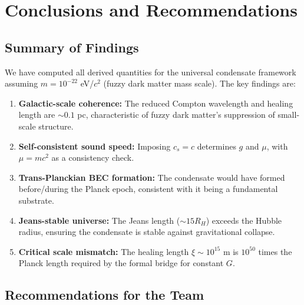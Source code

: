 \documentclass[11pt,a4paper]{article}
\begin{document}
\section{Conclusions and Recommendations}
\label{sec:conclusions}

\subsection{Summary of Findings}

We have computed all derived quantities for the universal condensate framework assuming $m = 10^{-22}$ eV/$c^2$ (fuzzy dark matter mass scale). The key findings are:

\begin{enumerate}
    \item \textbf{Galactic-scale coherence:} The reduced Compton wavelength and healing length are $\sim 0.1$ pc, characteristic of fuzzy dark matter's suppression of small-scale structure.

    \item \textbf{Self-consistent sound speed:} Imposing $c_s = c$ determines $g$ and $\mu$, with $\mu = mc^2$ as a consistency check.

    \item \textbf{Trans-Planckian BEC formation:} The condensate would have formed before/during the Planck epoch, consistent with it being a fundamental substrate.

    \item \textbf{Jeans-stable universe:} The Jeans length ($\sim 15 R_H$) exceeds the Hubble radius, ensuring the condensate is stable against gravitational collapse.

    \item \textbf{Critical scale mismatch:} The healing length $\xi \sim 10^{15}$ m is $10^{50}$ times the Planck length required by the formal bridge for constant $G$.
\end{enumerate}

\subsection{Recommendations for the Team}
\end{document}
